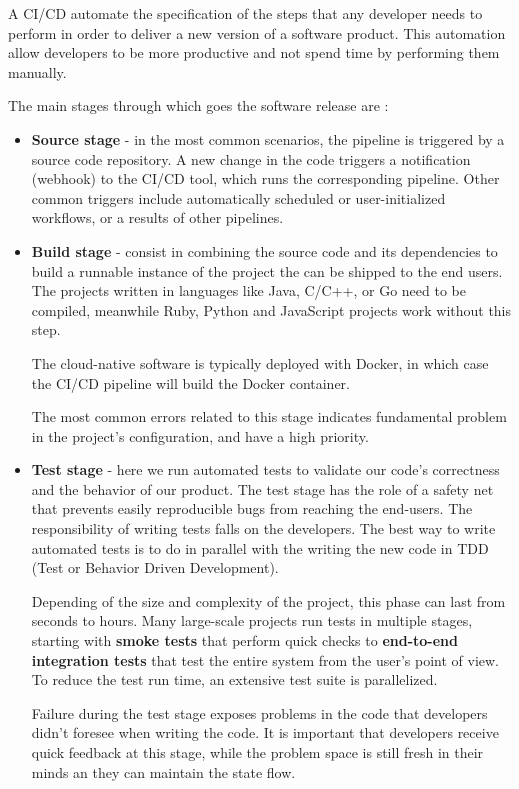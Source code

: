 \documentclass[12pt,a4paper,twoside]{article}
\begin{document}
A CI/CD automate the specification of the steps that any developer needs to perform in order to deliver a new version of a software product. This automation allow developers to be more productive and not spend time by performing them manually.

The main stages through which goes the software release are \cite{ELEMENTS-CI/CD}:

\begin{itemize}
	\item \textbf{Source stage} - in the most common scenarios, the pipeline is triggered by a source code repository. A new change in the code triggers a notification (webhook) to the CI/CD tool, which runs the corresponding pipeline. Other common triggers include automatically scheduled or user-initialized workflows, or a results of other pipelines.

	\item \textbf{Build stage} - consist in combining the source code and its dependencies to build a runnable instance of the project the can be shipped to the end users. The projects written in languages like Java, C/C++, or Go need to be compiled, meanwhile Ruby, Python and JavaScript projects work without this step.

The cloud-native software is typically deployed with Docker, in which case the CI/CD pipeline will build the Docker container.

The most common errors related to this stage indicates fundamental problem in the project's configuration, and have a high priority.

	\item \textbf{Test stage} - here we run automated tests to validate our code's correctness and the behavior of our product. The test stage has the role of a safety net that prevents easily reproducible bugs from reaching the end-users.
The responsibility of writing tests falls on the developers. The best way to write automated tests is to do in parallel with the writing the new code in TDD (Test or Behavior Driven Development).

Depending of the size and complexity of the project, this phase can last from seconds to hours. Many large-scale projects run tests in multiple stages, starting with \textbf{smoke tests} that perform quick checks to \textbf{end-to-end integration tests} that test the entire system from the user's point of view. To reduce the test run time, an extensive test suite is parallelized.

Failure during the test stage exposes problems in the code that developers didn't foresee when writing the code. It is important that developers receive quick feedback at this stage, while the problem space is still fresh in their minds an they can maintain the state flow.


\end{itemize}
\end{document}

